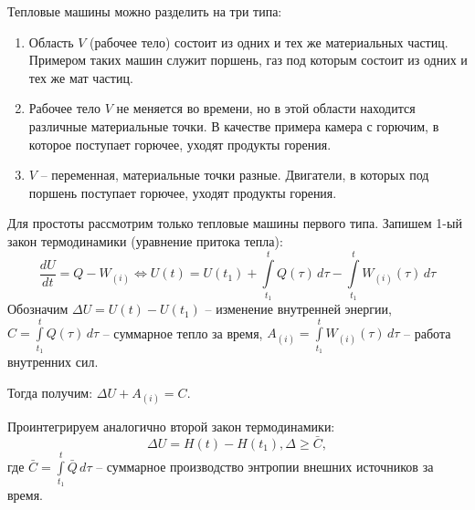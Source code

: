 Тепловые машины можно разделить на три типа:
\begin{enumerate}
  \item Область $V$ (рабочее тело) состоит из одних и тех же материальных частиц.
    Примером таких машин служит поршень, газ под которым состоит из одних и тех же мат частиц.
  \item Рабочее тело $V$ не меняется во времени, но в этой области находится различные
    материальные точки. В качестве примера камера с горючим, в которое поступает горючее,
    уходят продукты горения.
  \item $V$ -- переменная, материальные точки разные. Двигатели, в которых под поршень поступает
    горючее, уходят продукты горения.
\end{enumerate}

Для простоты рассмотрим только тепловые машины первого типа.
Запишем 1-ый закон термодинамики (уравнение притока тепла):
\[
  \dfrac{dU}{dt} = Q - W_{(i)} \Leftrightarrow 
  U(t) = U(t_1) + \int\limits_{t_1}^t Q(\tau) \, d\tau - \int\limits_{t_1}^t W_{(i)}(\tau)\, d\tau
\]
Обозначим $\Delta U = U(t) - U(t_1)$ -- изменение внутренней энергии,
$C = \int\limits_{t_1}^t Q(\tau) \, d\tau$ -- суммарное тепло за время, 
$A_{(i)} = \int\limits_{t_1}^t W_{(i)}(\tau) \, d\tau$ -- работа внутренних сил.

Тогда получим: $\Delta U + A_{(i)} = C$.

Проинтегрируем аналогично второй закон термодинамики:
\[
  \Delta U = H(t) - H(t_1), \Delta \geqslant \bar{C},
\]
где $\bar{C} = \int\limits_{t_1}^t \bar{Q} \, d\tau$ -- суммарное производство энтропии внешних источников за время.
